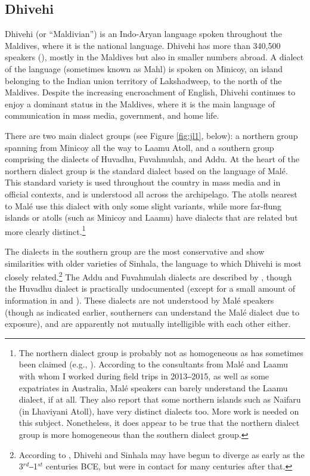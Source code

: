 \documentclass[output=paper]{langsci/langscibook}
\begin{document}
\subsection{Dhivehi}\label{s:jl1-2}

Dhivehi (or “Maldivian”) is an Indo-Aryan language spoken throughout the Maldives, where it is the national language. Dhivehi has more than 340,500 speakers (\citealt{Lewis2014}), mostly in the Maldives but also in smaller numbers abroad. A dialect of the language (sometimes known as Mahl) is spoken on Minicoy, an island belonging to the Indian union territory of Lakshadweep, to the north of the Maldives. Despite the increasing encroachment of English, Dhivehi continues to enjoy a dominant status in the Maldives, where it is the main language of communication in mass media, government, and home life. 

There are two main dialect groups (see Figure \ref{fig:jl1}, below): a northern group spanning from Minicoy all the way to Laamu Atoll, and a southern group comprising the dialects of Huvadhu, Fuvahmulah, and Addu. At the heart of the northern dialect group is the standard dialect based on the language of Malé. This standard variety is used throughout the country in mass media and in official contexts, and is understood all across the archipelago. The atolls nearest to Malé use this dialect with only some slight variants, while more far-flung islands or atolls (such as Minicoy and Laamu) have dialects that are related but more clearly distinct.\footnote{The northern dialect group is probably not as homogeneous as has sometimes been claimed (e.g., \citealt[13]{Fritz2002}). According to the consultants from Malé and Laamu with whom I worked during field trips in 2013‒2015, as well as some expatriates in Australia, Malé speakers can barely understand the Laamu dialect, if at all. They also report that some northern islands such as Naifaru (in Lhaviyani Atoll), have very distinct dialects too. More work is needed on this subject. Nonetheless, it does appear to be true that the northern dialect group is more homogeneous than the southern dialect group.} 

The dialects in the southern group are the most conservative and show similarities with older varieties of Sinhala, the language to which Dhivehi is most closely related.\footnote{According to \cite{Cain2000}, Dhivehi and Sinhala may have begun to diverge as early as the 3$^{rd}$‒1$^{st}$ centuries BCE, but were in contact for many centuries after that.}
The Addu and Fuvahmulah dialects are described by \cite{Fritz2002}, though the Huvadhu dialect is practically undocumented (except for a small amount of information in \citealt{Maumoon2002} and \citealt{Wijesundera1988}). These dialects are not understood by Malé speakers (though as indicated earlier, southerners can understand the Malé dialect due to exposure), and are apparently not mutually intelligible with each other either.
\end{document}
